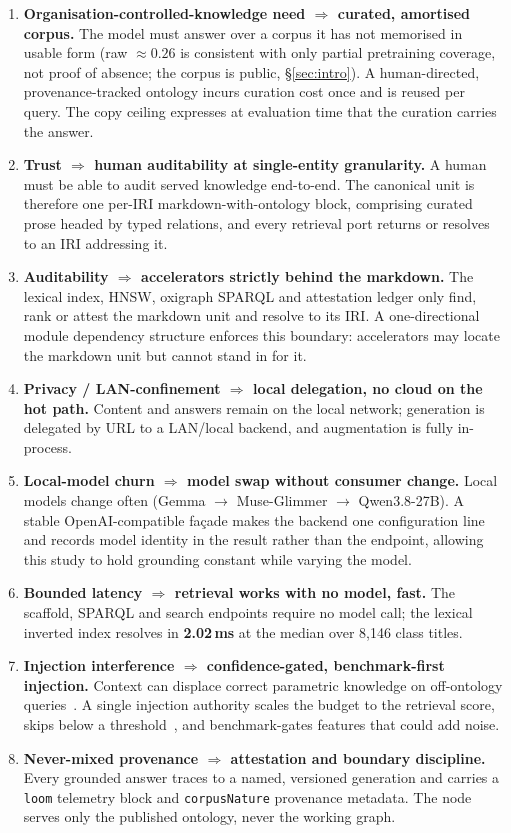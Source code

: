 \documentclass[10pt,twocolumn]{article}
\begin{document}


\begin{enumerate}[topsep=3pt,itemsep=2pt,leftmargin=1.5em]
\item \textbf{Organisation-controlled-knowledge need $\Rightarrow$ curated, amortised corpus.} The model must
answer over a corpus it has not memorised in usable form (raw $\approx0.26$ is consistent with only
partial pretraining coverage, not proof of absence; the corpus is public, \S\ref{sec:intro}). A human-directed, provenance-tracked ontology incurs curation cost once
and is reused per query. The copy ceiling expresses at evaluation time that the curation carries
the answer.
\item \textbf{Trust $\Rightarrow$ human auditability at single-entity granularity.} A human must
be able to audit served knowledge end-to-end. The canonical unit is therefore one per-IRI
markdown-with-ontology block, comprising curated prose headed by typed relations, and every
retrieval port returns or resolves to an IRI addressing it.
\item \textbf{Auditability $\Rightarrow$ accelerators strictly behind the markdown.} The lexical
index, HNSW, oxigraph SPARQL and attestation ledger only find, rank or attest the markdown unit and
resolve to its IRI. A one-directional module dependency structure enforces this boundary: accelerators may locate the markdown unit but cannot stand in for it.
\item \textbf{Privacy / LAN-confinement $\Rightarrow$ local delegation, no cloud on the hot path.}
Content and answers remain on the local network; generation is delegated by URL to a LAN/local
backend, and augmentation is fully in-process.
\item \textbf{Local-model churn $\Rightarrow$ model swap without consumer change.} Local models
change often (Gemma $\to$ Muse-Glimmer $\to$ Qwen3.8-27B). A stable OpenAI-compatible façade makes
the backend one configuration line and records model identity in the result rather than the
endpoint, allowing this study to hold grounding constant while varying the model.
\item \textbf{Bounded latency $\Rightarrow$ retrieval works with no model, fast.} The scaffold,
SPARQL and search endpoints require no model call; the lexical inverted index resolves in
\textbf{2.02\,ms} at the median over 8{,}146 class titles.
\item \textbf{Injection interference $\Rightarrow$ confidence-gated, benchmark-first injection.}
Context can displace correct parametric knowledge on off-ontology
queries~\cite{shi2023distracted,yoran2024robust,longpre2021entity}. A single injection authority
scales the budget to the retrieval score, skips below a threshold~\cite{mallen2023trust}, and
benchmark-gates features that could add noise.
\item \textbf{Never-mixed provenance $\Rightarrow$ attestation and boundary discipline.} Every
grounded answer traces to a named, versioned generation and carries a \texttt{loom} telemetry block
and \texttt{corpusNature} provenance metadata. The node serves only the published ontology, never the
working graph.
\end{enumerate}
\end{document}
